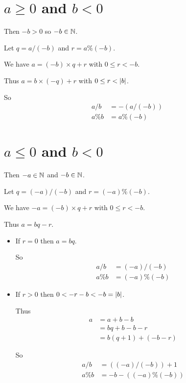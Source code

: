\section{$a \geq 0$ and $b < 0$}

  Then $-b > 0$ so $-b \in \mathbb{N}$.

  Let $q = a / (-b)$ and $r = a \% (-b)$.

  We have $a = (-b) \times q + r$ with $0 \leq r < -b$.

  Thus $a = b \times (-q) + r$ with $0 \leq r < | b |$.

  So
  \begin{align*}
    a / b & = - (a / (-b)) \\
    a \% b & = a \% (-b)
  \end{align*}

\section{$a \leq 0$ and $b < 0$}

  Then $-a \in \mathbb{N}$ and $-b \in \mathbb{N}$.

  Let $q = (-a) / (-b)$ and $r = (-a) \% (-b)$.

  We have $-a = (-b) \times q + r$ with $0 \leq r < -b$.

  Thus $a = b q - r$.

  \begin{itemize}
  \item If $r = 0$ then $a = b q$.

    So 
    \begin{align*}
      a / b & = (-a) / (-b) \\
      a \% b & = (-a) \% (-b)
    \end{align*}

  \item If $r > 0$ then $0 < -r - b < -b = | b |$.

    Thus
    \begin{align*}
      a & = a + b - b \\
      & = b q + b - b - r \\
      & = b (q+1) + (-b - r)
    \end{align*}

    So
    \begin{align*}
      a / b & = ((-a)/(-b)) + 1 \\
      a \% b & = - b - ((-a)\%(-b))
    \end{align*}
  \end{itemize}

